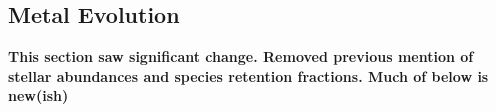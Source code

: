 \documentclass[twocolumn]{aastex61}
\begin{document}


\subsection{Metal Evolution} 
\label{sec:chemical evolution}
\textbf{This section saw significant change. Removed previous mention of stellar abundances and species retention fractions. Much of below is new(ish)}
\end{document}
